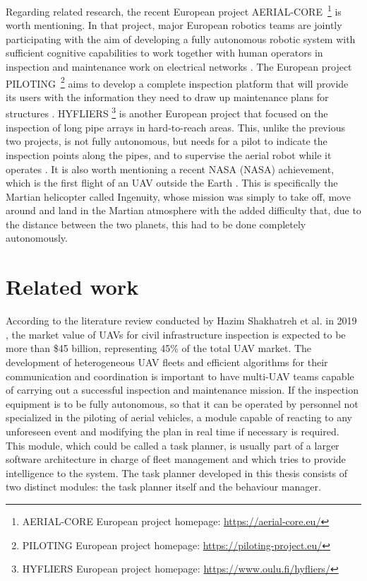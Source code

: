 Regarding related research, the recent European project AERIAL-CORE~\footnote{AERIAL-CORE European project homepage: \url{https://aerial-core.eu/}} is worth mentioning. In that project, major European robotics teams are jointly participating with the aim of developing a fully autonomous robotic system with sufficient cognitive capabilities to work together with human operators in inspection and maintenance work on electrical networks \cite{cacace2021safe}. The European project PILOTING~\footnote{PILOTING European project homepage: \url{https://piloting-project.eu/}} aims to develop a complete inspection platform that will provide its users with the information they need to draw up maintenance plans for structures \cite{benjumea2021localization}. HYFLIERS \footnote{HYFLIERS European project homepage: \url{https://www.oulu.fi/hyfliers/}} is another European project that focused on the inspection of long pipe arrays in hard-to-reach areas. This, unlike the previous two projects, is not fully autonomous, but needs for a pilot to indicate the inspection points along the pipes, and to supervise the aerial robot while it operates \cite{suarez2020aerial}. It is also worth mentioning a recent \acrshort{NASA} (\acrlong{NASA}) achievement, which is the first flight of an \gls{UAV} outside the Earth \cite{schroeder2020nasa, potter2020mars}. This is specifically the Martian helicopter called Ingenuity, whose mission was simply to take off, move around and land in the Martian atmosphere with the added difficulty that, due to the distance between the two planets, this had to be done completely autonomously.

\section{Related work}
\label{sec:RelatedWork}
According to the literature review conducted by Hazim Shakhatreh et al. in 2019 \cite{CivilAplications}, the market value of \glspl{UAV} for civil infrastructure inspection is expected to be more than \$45 billion, representing 45\% of the total \gls{UAV} market. The development of heterogeneous \gls{UAV} fleets and efficient algorithms for their communication and coordination is important to have multi-\gls{UAV} teams capable of carrying out a successful inspection and maintenance mission. If the inspection equipment is to be fully autonomous, so that it can be operated by personnel not specialized in the piloting of aerial vehicles, a module capable of reacting to any unforeseen event and modifying the plan in real time if necessary is required. This module, which could be called a task planner, is usually part of a larger software architecture in charge of fleet management and which tries to provide intelligence to the system. The task planner developed in this thesis consists of two distinct modules: the task planner itself and the behaviour manager.

